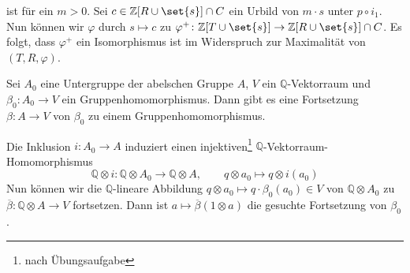 \begin{beweis}
	ist für ein $m >0$. Sei $c \in \mathbb{Z}[R \cup \set{s}] \cap C$ ein Urbild von $m \cdot s$ unter $p \circ i_1$. Nun können wir $\varphi$ durch $s \mapsto c$ zu
	$\varphi^+ \colon \mathbb{Z}\benbrace*{T \cup \set{s}} \to \mathbb{Z}\benbrace*{R \cup \set{s}} \cap C$. Es folgt, dass $\varphi^+$ ein Isomorphismus ist im Widerspruch zur 
	Maximalität von $(T,R,\varphi)$.
\end{beweis}

\begin{lemma}[label=lem:abel_qvek]
	Sei $A_0$ eine Untergruppe der abelschen Gruppe $A$, $V$ ein $\mathbb{Q}$-Vektorraum und $\beta_0 \colon A_0 \to V$ ein Gruppenhomomorphismus. Dann gibt es eine Fortsetzung 
	$\beta \colon A \to V$ von $\beta_0$ zu einem Gruppenhomomorphismus.  
\end{lemma}
\begin{beweis}
	Die Inklusion $i \colon A_0 \to A$ induziert einen injektiven\footnote{nach Übungsaufgabe} $\mathbb{Q}$-Vektorraum-Homomorphismus 
	\[
		\mathbb{Q}\otimes i \colon \mathbb{Q} \otimes A_0 \longrightarrow \mathbb{Q} \otimes A , \qquad q \otimes a_0 \mapsto q \otimes i(a_0)
	\]
	Nun können wir die $\mathbb{Q}$-lineare Abbildung $q \otimes a_0 \mapsto q \cdot \beta_0(a_0) \in V$ von $\mathbb{Q} \otimes A_0$ zu 
	$\overline{\beta} \colon \mathbb{Q} \otimes A \to V$ fortsetzen. Dann ist $a \mapsto \overline{\beta}(1 \otimes a)$ die gesuchte Fortsetzung von $\beta_0$.
\end{beweis}

